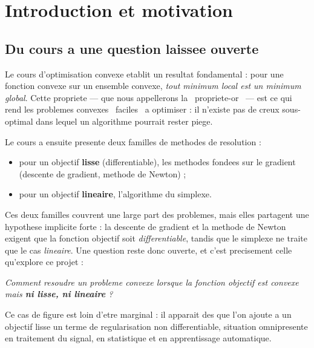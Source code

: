 \section{Introduction et motivation}
\label{sec:intro}

\subsection{Du cours a une question laissee ouverte}

Le cours d'optimisation convexe etablit un resultat fondamental : pour une
fonction convexe sur un ensemble convexe, \emph{tout minimum local est un
minimum global}. Cette propriete --- que nous appellerons la \guillemotleft{}~propriete-or~\guillemotright{}
--- est ce qui rend les problemes convexes \guillemotleft{}~faciles~\guillemotright{} a optimiser : il
n'existe pas de creux sous-optimal dans lequel un algorithme pourrait rester
piege.

Le cours a ensuite presente deux familles de methodes de resolution :
\begin{itemize}
  \item pour un objectif \textbf{lisse} (differentiable), les methodes fondees
        sur le gradient (descente de gradient, methode de Newton) ;
  \item pour un objectif \textbf{lineaire}, l'algorithme du simplexe.
\end{itemize}

Ces deux familles couvrent une large part des problemes, mais elles partagent
une hypothese implicite forte : la descente de gradient et la methode de Newton
exigent que la fonction objectif soit \emph{differentiable}, tandis que le
simplexe ne traite que le cas \emph{lineaire}. Une question reste donc ouverte,
et c'est precisement celle qu'explore ce projet :

\begin{center}
\itshape
Comment resoudre un probleme convexe lorsque la fonction objectif est
convexe mais \textbf{ni lisse, ni lineaire} ?
\end{center}

Ce cas de figure est loin d'etre marginal : il apparait des que l'on ajoute a
un objectif lisse un terme de regularisation non differentiable, situation
omnipresente en traitement du signal, en statistique et en apprentissage
automatique.

